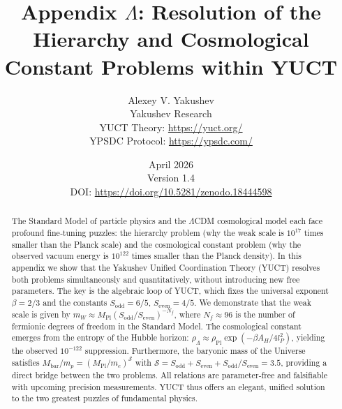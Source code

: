 \documentclass[12pt,a4paper]{article}
\begin{document}
	
	\title{\huge Appendix $\Lambda$: Resolution of the Hierarchy and Cosmological Constant Problems within YUCT}
	\author{\large Alexey V. Yakushev \\[0.3em] \small Yakushev Research \\ \small YUCT Theory: \url{https://yuct.org/} \\ \small YPSDC Protocol: \url{https://ypsdc.com/}}
	\date{\small April 2026 \\ \small Version 1.4 \\[1em] \small DOI: \url{https://doi.org/10.5281/zenodo.18444598}}
	
	\maketitle
	
	\newpage
	
	\begin{abstract}
		\noindent
		The Standard Model of particle physics and the $\Lambda$CDM cosmological model each face profound fine‑tuning puzzles: the hierarchy problem (why the weak scale is $10^{17}$ times smaller than the Planck scale) and the cosmological constant problem (why the observed vacuum energy is $10^{122}$ times smaller than the Planck density). In this appendix we show that the Yakushev Unified Coordination Theory (YUCT) resolves both problems simultaneously and quantitatively, without introducing new free parameters. The key is the algebraic loop of YUCT, which fixes the universal exponent $\beta = 2/3$ and the constants $S_{\mathrm{odd}} = 6/5$, $S_{\mathrm{even}} = 4/5$. We demonstrate that the weak scale is given by $m_W \approx M_{\mathrm{Pl}} (S_{\mathrm{odd}}/S_{\mathrm{even}})^{-N_f}$, where $N_f \approx 96$ is the number of fermionic degrees of freedom in the Standard Model. The cosmological constant emerges from the entropy of the Hubble horizon: $\rho_\Lambda \approx \rho_{\mathrm{Pl}} \exp(-\beta A_H / 4l_P^2)$, yielding the observed $10^{-122}$ suppression. Furthermore, the baryonic mass of the Universe satisfies $M_{\mathrm{bar}}/m_p = (M_{\mathrm{Pl}}/m_e)^{\mathcal{S}}$ with $\mathcal{S} = S_{\mathrm{odd}} + S_{\mathrm{even}} + S_{\mathrm{odd}}/S_{\mathrm{even}} = 3.5$, providing a direct bridge between the two problems. All relations are parameter‑free and falsifiable with upcoming precision measurements. YUCT thus offers an elegant, unified solution to the two greatest puzzles of fundamental physics.
	\end{abstract}
	
\end{document}
